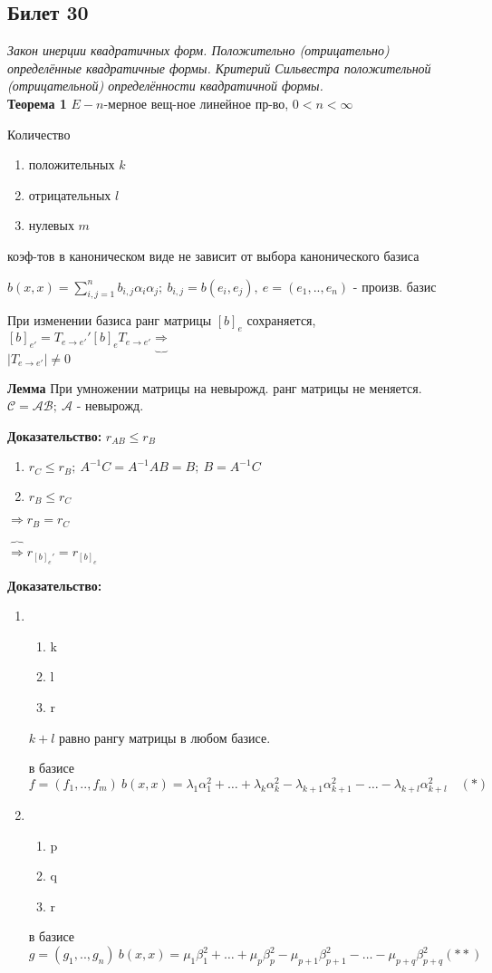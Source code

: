 \subsection{Билет 30}

\textit{Закон инерции квадратичных форм. Положительно (отрицательно) определённые квадратичные формы. Критерий Сильвестра положительной (отрицательной) определённости квадратичной формы.}\\

\textbf{Теорема 1} $E-n$-мерное вещ-ное линейное пр-во, $0 < n < \infty$

Количество 
\begin{enumerate}
 \item положительных $k$
 \item отрицательных $l$
 \item нулевых $m$
\end{enumerate} коэф-тов в каноническом виде не зависит от выбора канонического базиса

$b(x,x) = \sum\limits_{i,j=1}^n b_{i,j} \alpha_i \alpha_j;\ b_{i,j} = b(e_i, e_j),\ e=(e_1,..,e_n)$ - произв. базис

При изменении базиса ранг матрицы $[b]_e$ сохраняется, \quad $[b]_{e'} = T_{e\to e'}' [b]_e T_{e \to e'} \underbrace{\Rightarrow} $\\$ |T_{e\to e'}| \ne 0$

\textbf{Лемма} При умножении матрицы на невырожд. ранг матрицы не меняется. $\mathcal{C} = \mathcal{AB};\ \mathcal{A}$ - невырожд.

\textbf{Доказательство: } $r_{AB} \le r_{B}$
\begin{enumerate}
 \item $r_{C} \le r_{B};\ A^{-1} C = A^{-1}AB = B;\ B = A^{-1}C$
 \item $r_{B} \le r_{C}$
\end{enumerate} $\Rightarrow r_B = r_C$

$\overbrace{\Rightarrow} r_{[b]_e'} = r_{[b]_e}$

\textbf{Доказательство: } 
\begin{enumerate}
 \item 
       \begin{enumerate}
        \item k
	\item l
	\item r
       \end{enumerate}
    $k+l$ равно рангу матрицы в любом базисе. 

    в базисе $f = (f_1,..,f_m)\ b(x,x) = \lambda_1 \alpha_1^2 + \ldots + \lambda_k \alpha_k^2 - \lambda_{k+1}\alpha_{k+1}^2 - \ldots - \lambda_{k+l}\alpha_{k+l}^2\quad (*)$
 \item 
      \begin{enumerate}
       \item p
       \item q
       \item r
      \end{enumerate}
    в базисе $g = (g_1,..,g_n )\  b(x,x) = \mu_1\beta_1^2 + \ldots + \mu_p\beta_p^2 - \mu_{p+1}\beta_{p+1}^2 - \ldots - \mu_{p+q} \beta_{p+q}^2 (**)$ 
\end{enumerate}

